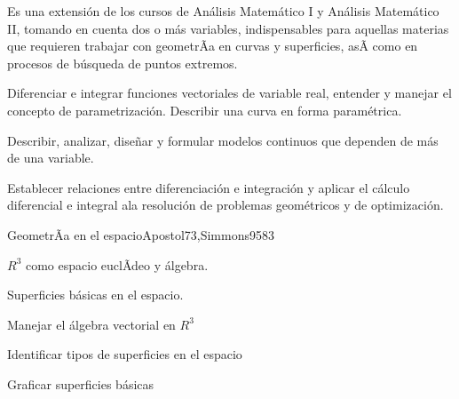 
\begin{syllabus}


\begin{justification}
Es una extensión de los cursos de Análisis Matemático I y Análisis Matemático II, tomando en cuenta dos o más variables, indispensables para aquellas materias que requieren trabajar con geometrÃ­a en curvas y superficies, asÃ­ como en procesos de búsqueda de puntos extremos.
\end{justification}

\begin{goals}
\item Diferenciar e integrar funciones vectoriales de variable real, entender y manejar el concepto de parametrización. Describir una curva en forma paramétrica.
\item Describir, analizar, diseñar y formular modelos continuos que dependen de más de una variable.
\item Establecer relaciones entre diferenciación e integración y aplicar el cálculo diferencial e integral ala resolución de problemas geométricos y de optimización.
\end{goals}

\begin{outcomes}
\end{outcomes}

\begin{unit}{GeometrÃ­a en el espacio}{Apostol73,Simmons95}{8}{3}
   \begin{topics}
      \item $R^3$ como espacio euclÃ­deo y álgebra.
      \item Superficies básicas en el espacio.
   \end{topics}

   \begin{learningoutcomes}
      \item Manejar el álgebra vectorial en $R^3$
      \item Identificar tipos de superficies en el espacio
      \item Graficar superficies básicas
      \end{learningoutcomes}
\end{unit}


\end{syllabus}
